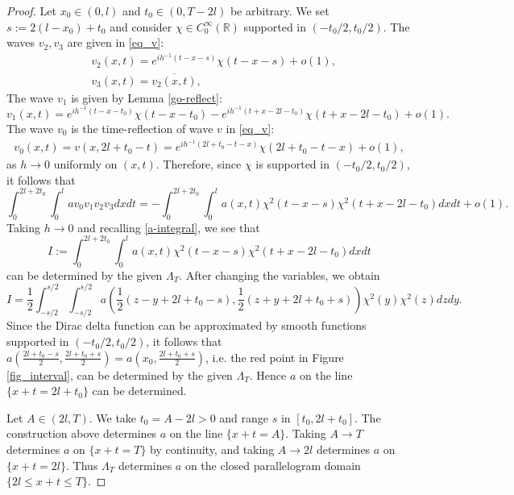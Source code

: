 \documentclass[11pt]{amsart}
\theoremstyle{definition}
\theoremstyle{plain}
\numberwithin{equation}{section}
\begin{document}
\begin{proof}
	Let $x_0\in (0,l)$ and $t_0\in (0,T-2l)$ be arbitrary. We set $s:= 2(l - x_0)+t_0$ and consider $\chi \in C_0^\infty(\mathbb{R})$ supported in $(-t_0/2,t_0/2)$. 
	The waves $v_2,v_3$ are given in \eqref{eq_v}:
	\begin{align*}
		&v_2(x,t) = e^{ih^{-1}(t - x - s)} \chi(t - x - s) + o(1),\\
		&v_3(x,t) = \overline{v_2(x,t)},
	\end{align*}
The wave $v_1$ is given by Lemma \ref{go-reflect}:
$$		v_1(x,t) = e^{ih^{-1}(t - x-t_0)} \chi(t - x-t_0)  - e^{ih^{-1}(t + x -2l-t_0)} \chi(t + x -2l-t_0) + o(1).$$
The wave $v_0$ is the time-reflection of wave $v$ in \eqref{eq_v}:
	\begin{align*}
		v_0(x,t) =v(x,2l+t_0-t)= e^{ih^{-1}(2l+t_0-t - x)} \chi(2l+t_0-t - x) + o(1),
	\end{align*}
	as $h\rightarrow 0$ uniformly on $(x,t)$. Therefore, since $\chi$ is supported in $(-t_0/2,t_0/2)$, it follows that
	\begin{equation*}
		\int_{0}^{2l+2t_0}\int_0^l av_0v_1v_2v_3 dxdt = - \int_{0}^{2l+2t_0}\int_0^l a(x,t) \chi^2(t - x - s) \chi^2(t + x -2l-t_0)dxdt + o(1).
	\end{equation*}
	Taking $h\rightarrow 0$ and recalling \eqref{a-integral}, we see that 
	\begin{equation*}
		I :=  \int_{0}^{2l+2t_0}\int_0^l a(x,t) \chi^2(t - x - s) \chi^2(t + x -2l-t_0)dxdt
	\end{equation*}
	can be determined by the given $\Lambda_T$. After changing the variables, we obtain
	\begin{equation*}
		I = \frac{1}{2} \int_{-s/2}^{s/2}\int_{-s/2}^{s/2} a\left(\frac{1}{2}(z - y +2l+t_0 - s),\frac{1}{2}(z + y +2l+t_0 +s)\right) \chi^2(y)\chi^2(z)dzdy.
	\end{equation*}
Since the Dirac delta function can be approximated by smooth functions supported in $(-t_0/2,t_0/2)$, it follows that $a\left(\frac{2l+t_0 - s}{2},\frac{2l+t_0 + s}{2}\right)=a\left(x_0,\frac{2l+t_0 + s}{2}\right)$, i.e. the red point in Figure \ref{fig_interval}, can be determined by the given $\Lambda_T$. Hence $a$ on the line $\{x+t=2l+t_0\}$ can be determined.

Let $A\in (2l,T)$. We take $t_0=A-2l>0$ and range $s$ in $[t_0,2l+t_0]$. 
The construction above determines $a$ on the line $\{x+t=A\}$.
Taking $A \to T$ determines $a$ on $\{x+t = T\}$ by continuity, and taking $A \to 2l$ determines $a$ on $\{x+t = 2l\}$.
Thus $\Lambda_T$ determines $a$ on the closed parallelogram domain $\{2l \leq x+t \leq T\}$.
\end{proof}
\end{document}
